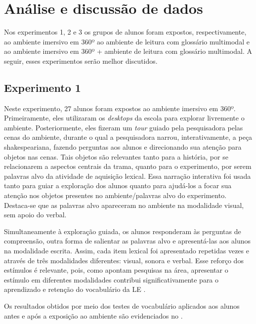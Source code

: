 \section{Análise e discussão de dados}\label{sec-analiseediss}

Nos experimentos 1, 2 e 3 os grupos de alunos foram expostos,
respectivamente, ao ambiente imersivo em 360º ao ambiente de leitura com
glossário multimodal e ao ambiente imersivo em 360º + ambiente de
leitura com glossário multimodal. A seguir, esses experimentos serão
melhor discutidos.

\subsection{Experimento 1}\label{sub-sec-experimento1}

Neste experimento, 27 alunos foram expostos ao ambiente imersivo em
360º. Primeiramente, eles utilizaram os \emph{desktops} da escola para
explorar livremente o ambiente. Posteriormente, eles fizeram um
\emph{tour} guiado pela pesquisadora pelas cenas do ambiente, durante o
qual a pesquisadora narrou, interativamente, a peça shakespeariana,
fazendo perguntas aos alunos e direcionando sua atenção para objetos nas
cenas. Tais objetos são relevantes tanto para a história, por se
relacionarem a aspectos centrais da trama, quanto para o experimento,
por serem palavras alvo da atividade de aquisição lexical. Essa narração
interativa foi usada tanto para guiar a exploração dos alunos quanto
para ajudá-los a focar sua atenção nos objetos presentes no
ambiente/palavras alvo do experimento. Destaca-se que as palavras alvo
apareceram no ambiente na modalidade visual, sem apoio do verbal.

Simultaneamente à exploração guiada, os alunos responderam às perguntas
de compreensão, outra forma de salientar as palavras alvo e
apresentá-las aos alunos na modalidade escrita. Assim, cada item lexical
foi apresentado repetidas vezes e através de três modalidades
diferentes: visual, sonora e verbal. Esse reforço dos estímulos é
relevante, pois, como apontam pesquisas na área, apresentar o estímulo
em diferentes modalidades contribui significativamente para o
aprendizado e retenção do vocabulário da LE \cite{chun1996,saito2015,procopio2016,mayer2001,monteiro2021}.

Os resultados obtidos por meio dos testes de vocabulário aplicados aos
alunos antes e após a exposição ao ambiente são evidenciados no .

